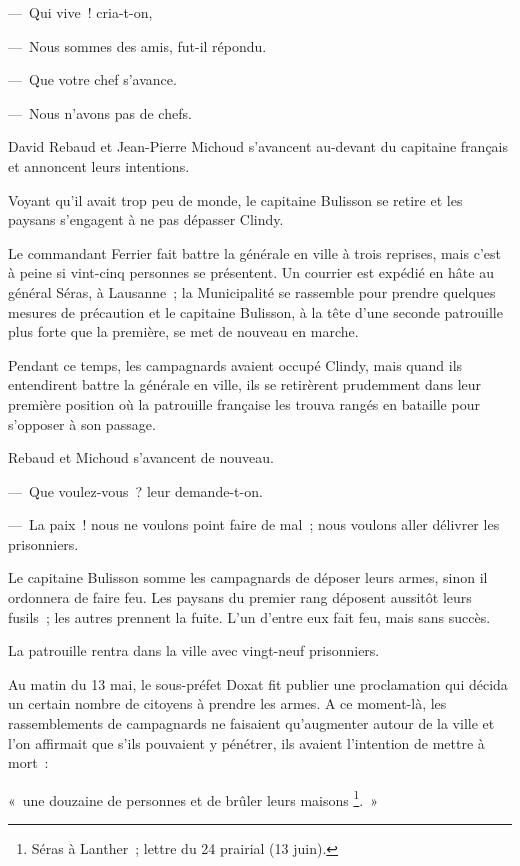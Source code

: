 \documentclass[french,twoside]{book} %
\newenvironment{quoteblock}%
  {\begin{quoting}}
  {\end{quoting}}
\newenvironment{quotebar}{%
    \def\FrameCommand{{\color{rubric!10!}\vrule width 0.5em} \hspace{0.9em}}%
    \def\OuterFrameSep{\itemsep} %
    \MakeFramed {\advance\hsize-\width \FrameRestore}
  }%
  {%
    \endMakeFramed
  }
\renewenvironment{quoteblock}%
  {%
    \savenotes
    \setstretch{0.9}
    \normalfont
    \begin{quotebar}
  }
  {%
    \end{quotebar}
    \spewnotes
  }
\begin{document}
— Qui vive ! cria-t-on,\par
— Nous sommes des amis, fut-il répondu.\par
— Que votre chef s’avance.\par
— Nous n’avons pas de chefs.\par
David Rebaud et Jean-Pierre Michoud s’avancent au-devant du capitaine français et annoncent leurs intentions.\par
Voyant qu’il avait trop peu de monde, le capitaine Bulisson se retire et les paysans s’engagent à ne pas dépasser Clindy.\par
Le commandant Ferrier fait battre la générale en ville à trois reprises, mais c’est à peine si vint-cinq personnes se présentent. Un courrier est expédié en hâte au général Séras, à Lausanne ; la Municipalité se rassemble pour prendre quelques mesures de précaution et le capitaine Bulisson, à la tête d’une seconde patrouille plus forte que la première, se met de nouveau en marche.\par
Pendant ce temps, les campagnards avaient occupé Clindy, mais quand ils entendirent battre la générale en ville, ils se retirèrent prudemment dans leur première position où la patrouille française les trouva rangés en bataille pour s’opposer à son passage.\par
Rebaud et Michoud s’avancent de nouveau.\par
— Que voulez-vous ? leur demande-t-on.\par
— La paix ! nous ne voulons point faire de mal ; nous voulons aller délivrer les prisonniers.\par
Le capitaine Bulisson somme les campagnards de déposer leurs armes, sinon il ordonnera de faire feu. Les paysans du premier rang déposent aussitôt leurs fusils ; les autres prennent la fuite. L’un d’entre eux fait feu, mais sans succès.\par
La patrouille rentra dans la ville avec vingt-neuf prisonniers.\par
Au matin du 13 mai, le sous-préfet Doxat fit publier une proclamation qui décida un certain nombre de citoyens à prendre les armes. A ce moment-là, les rassemblements de campagnards ne faisaient qu’augmenter autour de la ville et l’on affirmait que s’ils pouvaient y pénétrer, ils avaient l’intention de mettre à mort :\par

\begin{quoteblock}
\noindent « une douzaine de personnes et de brûler leurs maisons \footnote{Séras à Lanther ; lettre du 24 prairial (13 juin).}. »\end{quoteblock}
\end{document}
